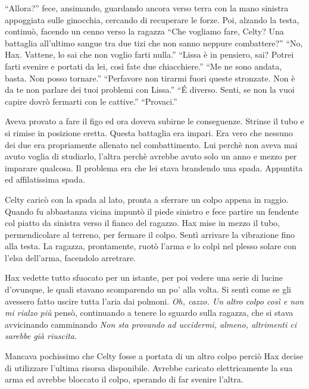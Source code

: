     ``Allora?'' fece, ansimando, guardando ancora verso terra con la mano
    sinistra appoggiata sulle ginocchia, cercando di
    recuperare le forze. Poi, alzando la testa, continuò, facendo un cenno
    verso la ragazza ``Che vogliamo fare, Celty? Una battaglia all'ultimo
    sangue tra due tizi che non sanno neppure combattere?'' ``No, Hax.
    Vattene, lo sai che non voglio farti nulla.'' ``Lissa è in pensiero,
    sai? Potrei farti svenire e portati da lei, così fate due
    chiacchiere.'' ``Me ne sono andata, basta. Non posso tornare.''
    ``Perfavore non tirarmi fuori queste stronzate. Non è da te non parlare
    dei tuoi problemi con Lissa.'' ``\'E diverso. Senti, se non la vuoi
    capire dovrò fermarti con le cattive.'' ``Provaci.''

    Aveva provato a fare il figo ed ora doveva subirne le conseguenze.
    Strinse il tubo e si rimise in posizione eretta. Questa battaglia era
    impari. Era vero che nessuno dei due era propriamente allenato nel
    combattimento. Lui perchè non aveva mai avuto voglia di studiarlo,
    l'altra perchè avrebbe avuto solo un anno e mezzo per imparare
    qualcosa. Il problema era che lei stava brandendo una spada. Appuntita
    ed affilatissima spada.

    Celty caricò con la spada al lato, pronta a sferrare un colpo appena in
    raggio. Quando fu abbastanza vicina impuntò il piede sinistro e fece
    partire un fendente col piatto da sinistra verso il fianco del ragazzo.
    Hax mise in mezzo il tubo, permendicolare al terreno, per fermare il
    colpo. Sentì arrivare la vibrazione fino alla testa. La ragazza,
    prontamente, ruotò l'arma e lo colpì nel plesso solare con l'elsa
    dell'arma, facendolo arretrare.

    Hax vedette tutto sfuocato per un istante, per poi vedere una serie di
    lucine d'ovunque, le quali stavano scomparendo un po' alla volta. Si
    sentì come se gli avessero fatto uscire tutta l'aria dai polmoni.
    \emph{Oh, cazzo. Un altro colpo così e non mi rialzo più} pensò,
    continuando a tenere lo sguardo sulla ragazza, che si stava avvicinando
    camminando \emph{Non sta provando ad uccidermi, almeno, altrimenti ci
    sarebbe già riuscita.}

    Mancava pochissimo che Celty fosse a portata di un altro colpo perciò
    Hax decise di utilizzare l'ultima risorsa disponibile. Avrebbe caricato
    elettricamente la sua arma ed avrebbe bloccato il colpo, sperando di
    far svenire l'altra.

